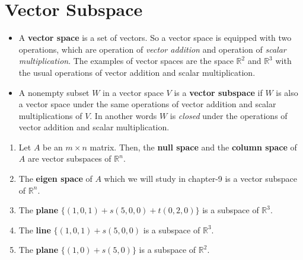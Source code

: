 \documentclass[math101_lecturenotes_ku.tex]{subfiles}
\begin{document}
  \section{Vector Subspace}
  \begin{itemize}
  \item A \textbf{vector space} is a set of vectors. So a vector space is equipped with two operations, which are operation of \textit{vector addition} and operation of \textit{scalar multiplication}. The examples of vector spaces are the space \(\mathbb{R}^2\) and \(\mathbb{R}^3\) with the usual operations of vector addition and scalar multiplication.


\item A nonempty subset \(W\) in a vector space \(V\) is a \textbf{vector subspace} if \(W\) is also a vector space under the same operations of vector addition and scalar multiplications of \(V\). In another words \(W\) is \textit{closed} under the operations of vector addition and scalar multiplication.
\end{itemize}
\begin{example}
  \begin{enumerate}
  \item Let \(A\) be an \(m \times n\) matrix. Then, the \textbf{null space} and the \textbf{column space} of \(A\) are vector subspaces of \(\mathbb{R}^n\).

  \item The \textbf{eigen space} of \(A\) which we will study in chapter-9 is a vector subspace of \(\mathbb{R}^n\).

  \item The \textbf{plane} \(\{(1,0,1) + s(5,0,0) + t (0,2,0)\}\) is a subspace of \(\mathbb{R}^3\).

  \item The \textbf{line} \(\{(1,0,1) + s(5,0,0)\) is a subspace of \(\mathbb{R}^3\).

        \item The \textbf{plane} \(\{(1,0) + s(5,0)\}\) is a subspace of \(\mathbb{R}^2\).
  \end{enumerate}

\end{example}
\end{document}
